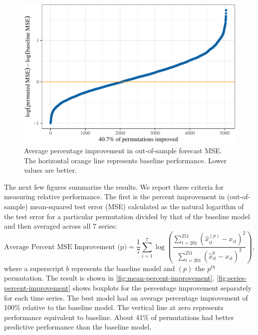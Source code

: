 \documentclass[11pt]{article}
\renewcommand{\hat}{\widehat}
\begin{document}
\begin{figure}[t]

{\centering \includegraphics{gfx/mean-percent-improvement-1} 

}

\caption{Average percentage improvement in out-of-sample forecast MSE. The horizontal orange line represents baseline performance. Lower values are better.}\label{fig:mean-percent-improvement}
\end{figure}

The next few figures summarize the results. We report three criteria for
measuring relative performance. The first is the percent improvement in
(out-of-sample) mean-squared test error (MSE) calculated as the natural
logarithm of the test error for a particular permutation divided by that
of the baseline model and then averaged across all 7 series:
\begin{equation}
  \mbox{Average Percent MSE Improvement (p)} = \frac{1}{7} \sum_{i=1}^7 \log
  \left(\frac{\sum_{t=201}^{251} (\hat{x}_{it}^{(p)}-x_{it})^2}
    {\sum_{t=201}^{251} (\hat{x}_{it}^{b}-x_{it})^2}\right),
\end{equation} where a superscript \(b\) represents the baseline model
and \((p)\) the \(p^{th}\) permutation. The result is shown in
\autoref{fig:mean-percent-improvement}.
\autoref{fig:series-percent-improvement} shows boxplots for the
percentage improvement separately for each time series. The best model
had an average percentage improvement of 100\% relative to the baseline
model. The vertical line at zero represents performance equivalent to
baseline. About 41\% of permutations had better predictive performance
than the baseline model.
\end{document}
